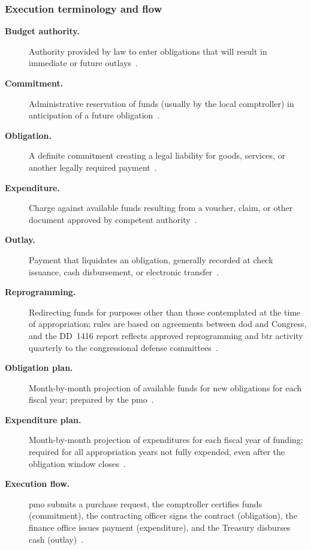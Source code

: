 \documentclass[../main.tex]{subfiles}
\begin{document}
\subsubsection{Execution terminology and flow}
\begin{description}
  \item[\textbf{Budget authority.}] Authority provided by law to enter obligations that will result in immediate or future outlays~\autocite{GAO-Budget-Glossary-2005}.
  \item[\textbf{Commitment.}] Administrative reservation of funds (usually by the local comptroller) in anticipation of a future obligation~\autocite{edo-3-1-4-budget-execution-2025}.
  \item[\textbf{Obligation.}] A definite commitment creating a legal liability for goods, services, or another legally required payment~\autocite{GAO-Budget-Glossary-2005}.
  \item[\textbf{Expenditure.}] Charge against available funds resulting from a voucher, claim, or other document approved by competent authority~\autocite{edo-3-1-4-budget-execution-2025}.
  \item[\textbf{Outlay.}] Payment that liquidates an obligation, generally recorded at check issuance, cash disbursement, or electronic transfer~\autocite{GAO-Budget-Glossary-2005}.
  \item[\textbf{Reprogramming.}] Redirecting funds for purposes other than those contemplated at the time of appropriation; rules are based on agreements between \ac{dod} and Congress, and the DD~1416 report reflects approved reprogramming and \ac{btr} activity quarterly to the congressional defense committees~\autocite{edo-3-1-4-budget-execution-2025,DoDFMR-Vol3-Ch6}.
  \item[\textbf{Obligation plan.}] Month-by-month projection of available funds for new obligations for each fiscal year; prepared by the \ac{pmo}~\autocite{edo-3-1-4-budget-execution-2025}.
  \item[\textbf{Expenditure plan.}] Month-by-month projection of expenditures for each fiscal year of funding; required for all appropriation years not fully expended, even after the obligation window closes~\autocite{edo-3-1-4-budget-execution-2025}.
\end{description}

\begin{description}
  \item[\textbf{Execution flow.}] \ac{pmo} submits a purchase request, the comptroller certifies funds (commitment), the contracting officer signs the contract (obligation), the finance office issues payment (expenditure), and the Treasury disburses cash (outlay)~\autocite{edo-3-1-4-budget-execution-2025}.
\end{description}
\end{document}
